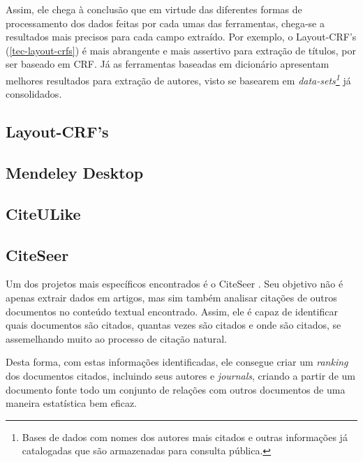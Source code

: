 Assim, ele chega à conclusão que em virtude das diferentes formas de processamento dos dados feitas por cada umas das ferramentas, chega-se a resultados mais precisos para cada campo extraído. Por exemplo, o Layout-CRF's (\autoref{tec-layout-crfs}) é mais abrangente e mais assertivo para extração de títulos, por ser baseado em CRF. Já as ferramentas baseadas em dicionário apresentam melhores resultados para extração de autores, visto se basearem em \textit{data-sets\footnote{Bases de dados com nomes dos autores mais citados e outras informações já catalogadas que são armazenadas para consulta pública.}} já consolidados.


\subsection{Layout-CRF's}
\label{tec-layout-crfs}


\subsection{Mendeley Desktop}
\label{tec-mendeley}


\subsection{CiteULike}
\label{tec-citeulike}


\subsection{CiteSeer}

Um dos projetos mais específicos encontrados é o CiteSeer \cite{citeseer}. Seu objetivo não é apenas extrair dados em artigos, mas sim também analisar citações de outros documentos no conteúdo textual encontrado. Assim, ele é capaz de identificar quais documentos são citados, quantas vezes são citados e onde são citados, se assemelhando muito ao processo de citação natural.

Desta forma, com estas informações identificadas, ele consegue criar um \textit{ranking} dos documentos citados, incluindo seus autores e \textit{journals}, criando a partir de um documento fonte todo um conjunto de relações com outros documentos de uma maneira estatística bem eficaz.

